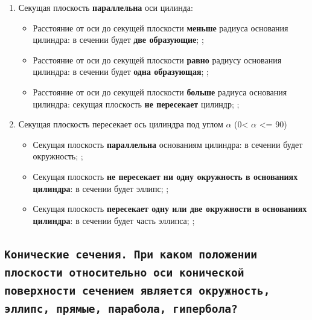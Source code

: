 \begin{enumerate}
    \item Секущая плоскость {\bf параллельна} оси цилинда:
    \begin{itemize}
        
        \item Расстояние от оси до секущей плоскости {\bf меньше} радиуса основания цилиндра: в сечении будет {\bf две образующие};
        ;

        \item Расстояние от оси до секущей плоскости {\bf равно} радиусу основания цилиндра: в сечении будет {\bf одна образующая}; 
        ;

        \item Расстояние от оси до секущей плоскости {\bf больше} радиуса основания цилиндра: секущая плоскость {\bf не пересекает} цилиндр;
        ;

    \end{itemize}
    \item Секущая плоскость пересекает ось цилиндра под углом $\alpha$ (0\textdegree < $\alpha$ <= 90\textdegree)
    \begin {itemize}

        \item Секущая плоскость {\bf параллельна} основаниям цилиндра: в сечении будет окружность;
        ;

        \item Секущая плоскость {\bf не пересекает ни одну окружность в основаниях цилиндра}: в сечении будет эллипс;
        ;

        \item Секущая плоскость {\bf пересекает одну или две окружности в основаниях цилиндра}: в сечении будет часть эллипса;
        ;

    \end{itemize}
    
\end{enumerate}

\newpage
\subsection{\texttt{Конические сечения. При каком положении плоскости относительно оси конической поверхности сечением является окружность, эллипс, прямые, парабола, гипербола?}}

